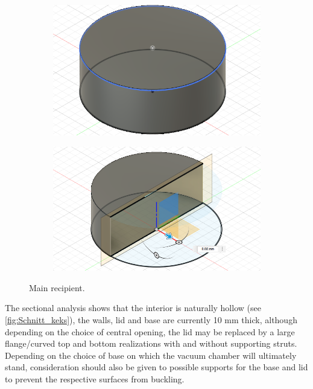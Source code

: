 \begin{figure}[H]
    \centering
    \begin{subfigure}[b]{0.49\textwidth}
        \centering
        \includegraphics[width=1\textwidth]{sections/imges/vacuum_vessel/Keksdose.PNG}
        \label{fig:main}
    \end{subfigure}
    \hfill
    \begin{subfigure}[b]{0.49\textwidth}
        \centering
        \includegraphics[width=1\textwidth]{sections/imges/vacuum_vessel/Keksdose_Schnitt.PNG}
        \label{fig:Schnitt_keks}
    \end{subfigure}
    \caption{Main recipient.}
\end{figure}

The sectional analysis shows that the interior is naturally hollow (see \autoref{fig:Schnitt_keks}), the walls, lid and base are currently 10 mm thick, although depending on the choice of central opening, the lid may be replaced by a large flange/curved top and bottom realizations with and without supporting struts.
Depending on the choice of base on which the vacuum chamber will ultimately stand, consideration should also be given to possible supports for the base and lid to prevent the respective surfaces from buckling.



